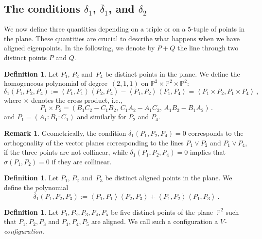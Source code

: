 \documentclass{amsart}
\theoremstyle{plain}
\theoremstyle{definition}
\newtheorem{definition}[lemma]{Definition}
\newtheorem{rmk}[lemma]{Remark}
\newcommand{\p}{\mathbb{P}}
\newcommand{\scl}[2]{\left\langle {#1}, {#2} \right\rangle}
\begin{document}
\subsection{The conditions $\delta_1$, $\bar{\delta}_1$, and $\delta_2$}

We now define three quantities depending on a triple or on a $5$-tuple of points in the plane.
These quantities are crucial to describe what happens when we have aligned eigenpoints.
In the following, we denote by $P + Q$ the line through two distinct points $P$ and $Q$.

\begin{definition}
\label{definition:delta1}
 Let $P_1$, $P_2$ and~$P_4$ be distinct points in the plane.
 We define the homogeneous polynomial of degree~$(2,1,1)$ on $\p^2 \times \p^2 \times \p^2$:
 \[
  \delta_1(P_1, P_2, P_4) :=
  \scl{P_1}{P_1} \scl{P_2}{P_4} - \scl{P_1}{P_2}\scl{P_1}{P_4}
  =
  \scl{P_1\times P_2}{P_1 \times P_4} \,,
 \]
 where $\times$ denotes the cross product, i.e.,
 \[
  P_1 \times P_2 = (B_1 C_2 - C_1 B_2, \, C_1 A_2 - A_1 C_2, \, A_1 B_2 - B_1 A_2) \,.
 \]
 and $P_1 = (A_1: B_1: C_1)$ and similarly for $P_2$ and $P_4$.
\end{definition}

\begin{rmk}\label{rmk: significato di delta1}
 Geometrically, the condition $\delta_1(P_1, P_2, P_4) = 0$ corresponds to the orthogonality of the vector planes corresponding to the lines $P_1 \vee P_2$ and $P_1 \vee P_4$, if the three points are not collinear, while
 $\delta_1(P_1, P_2, P_4) = 0$ implies that $\sigma (P_1,P_2)=0$ if they are collinear.
\end{rmk}


\begin{definition}
\label{definition:delta1b}
 Let $P_1$, $P_2$ and~$P_3$ be distinct aligned points in the plane.
 We define the polynomial
 \[
  \overline{\delta}_1(P_1, P_2, P_3) :=
  \scl{P_1}{P_1} \scl{P_2}{P_3} + \scl{P_1}{P_2}\scl{P_1}{P_3} \,.
  \]
\end{definition}

\begin{definition}
\label{Vconf}
Let $P_1, P_2, P_3, P_4, P_5$ be five distinct points of the plane~$\p^2$
such that $P_1, P_2, P_3$ and $P_1, P_4, P_5$ are aligned.
We call such a configuration a \emph{$V$-configuration}.
\end{definition}
\end{document}
